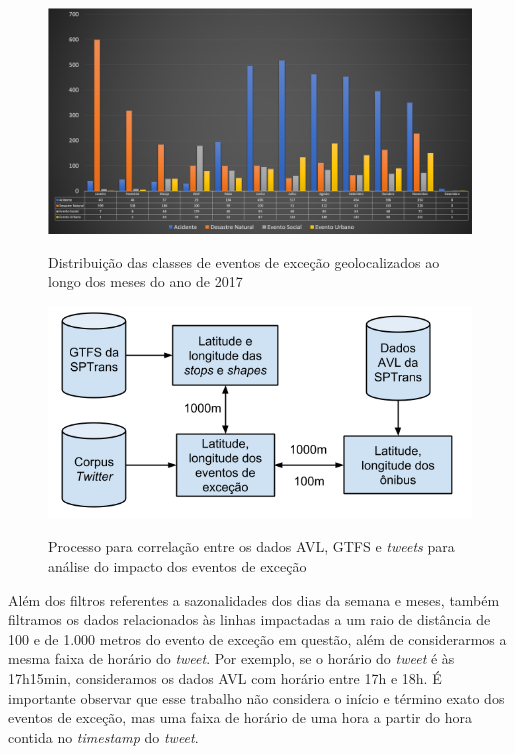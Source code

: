 \documentclass[
	12pt,				%
	oneside,			%
	a4paper,			%
	english,			%
	brazil				%
	]{abntex2ppgsi}
\begin{document}
{{\begin{figure}[!htb]
	\centering
 	  \caption{Distribuição das classes de eventos de exceção geolocalizados ao longo dos meses do ano de 2017}
		\includegraphics[width=1\linewidth]{images/exception_events_classification_distribution_pt.png}
	\label{fig:exception_events_classification_distribution}
\end{figure}

\begin{figure}[!htb]
	\centering
 	  \caption{Processo para correlação entre os dados AVL, GTFS e \textit{tweets} para análise do impacto dos eventos de exceção}
		\includegraphics[width=0.7\linewidth]{images/avl_tweets_correlation_pt.png}
	\label{fig:avl_tweets_correlation_pt}
\end{figure}

Além dos filtros referentes a sazonalidades dos dias da semana e meses, também filtramos os dados relacionados às linhas impactadas a um raio de distância de 100 e de 1.000 metros do evento de exceção em questão, além de considerarmos a mesma faixa de horário do \textit{tweet}. Por exemplo, se o horário do \textit{tweet} é às 17h15min, consideramos os dados AVL com horário entre 17h e 18h. É importante observar que esse trabalho não considera o início e término exato dos eventos de exceção, mas uma faixa de horário de uma hora a partir do hora contida no \textit{timestamp}  do \textit{tweet}.

}}
\end{document}
